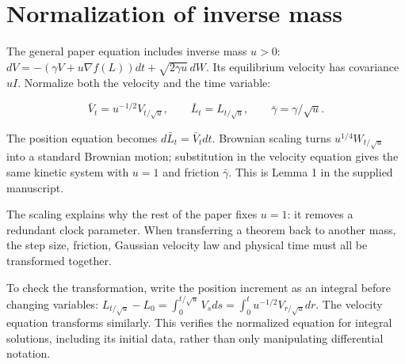 \documentclass[11pt,a4paper]{article}
\begin{document}
\section{\texorpdfstring{Normalization of inverse mass}{Normalization of inverse mass}}


The general paper equation includes inverse mass \(u>0\):
\(dV=-(\gamma V+u\nabla f(L))dt+\sqrt{2\gamma u}\,dW\).
Its equilibrium velocity has covariance \(uI\). Normalize both the velocity
and the time variable:


\[\bar V_t=u^{-1/2}V_{t/\sqrt u},\qquad
\bar L_t=L_{t/\sqrt u},\qquad \bar\gamma=\gamma/\sqrt u.\]


The position equation becomes \(d\bar L_t=\bar V_tdt\). Brownian scaling
turns \(u^{1/4}W_{t/\sqrt u}\) into a standard Brownian motion; substitution
in the velocity equation gives the same kinetic system with \(u=1\) and
friction \(\bar\gamma\). This is Lemma 1 in the supplied manuscript.




The scaling explains why the rest of the paper fixes \(u=1\): it removes
a redundant clock parameter. When transferring a theorem back to another mass,
the step size, friction, Gaussian velocity law and physical time must all be
transformed together.



To check the transformation, write the position increment as an integral before changing variables: \(L_{t/\sqrt u}-L_0=\int_0^{t/\sqrt u}V_sds=\int_0^tu^{-1/2}V_{r/\sqrt u}dr\). The velocity equation transforms similarly. This verifies the normalized equation for integral solutions, including its initial data, rather than only manipulating differential notation.
\end{document}

